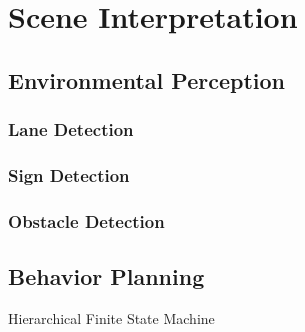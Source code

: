 \chapter{Scene Interpretation}
\label{chp:b4}

\section{Environmental Perception}
\subsection{Lane Detection}
\subsection{Sign Detection}
\subsection{Obstacle Detection}

\section{Behavior Planning}
Hierarchical Finite State Machine
